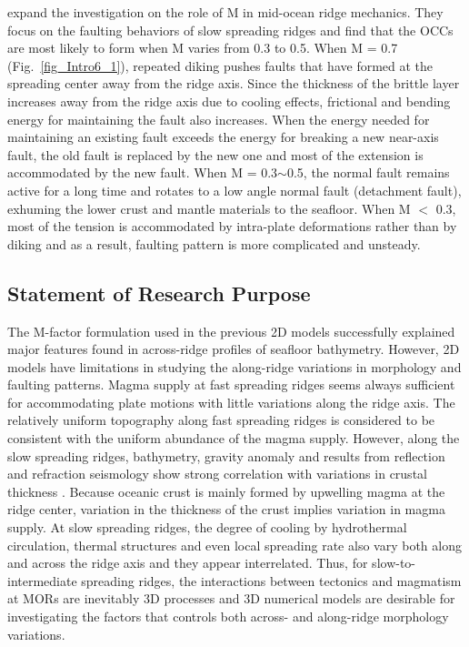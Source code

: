 \documentclass[draft,gc]{agutex}
\begin{document}
\begin{article}
\citet{Tucholke2008} expand the investigation on the role of M in mid-ocean ridge mechanics. They focus on the faulting behaviors of slow spreading ridges and find that the OCCs are most likely to form when M varies from 0.3 to 0.5. When M = 0.7 (Fig.~\ref{fig_Intro6_1}), repeated diking pushes faults that have formed at the spreading center away from the ridge axis. Since the thickness of the brittle layer increases away from the ridge axis due to cooling effects, frictional and bending energy for maintaining the fault also increases. When the energy needed for maintaining an existing fault exceeds the energy for breaking a new near-axis fault, the old fault is replaced by the new one and most of the extension is accommodated by the new fault. When M = 0.3$\sim$0.5, the normal fault remains active for a long time and rotates to a low angle normal fault (detachment fault), exhuming the lower crust and mantle materials to the seafloor. When M $<$ 0.3, most of the tension is accommodated by intra-plate deformations rather than by diking and as a result, faulting pattern is more complicated and unsteady.

\subsection{Statement of Research Purpose}
The M-factor formulation used in the previous 2D models \citep[e.g.,][]{Buck2005,Tucholke2008} successfully explained major features found in across-ridge profiles of seafloor bathymetry. However, 2D models have limitations in studying the along-ridge variations in morphology and faulting patterns. Magma supply at fast spreading ridges seems always sufficient for accommodating plate motions with little variations along the ridge axis. The relatively uniform topography along fast spreading ridges is considered to be consistent with the uniform abundance of the magma supply. However, along the slow spreading ridges, bathymetry, gravity anomaly and results from reflection and refraction seismology show strong correlation with variations in crustal thickness \citep[e.g.,][]{Lin1990, Tolstoy1993, Chen1999, Ryan2009}. Because oceanic crust is mainly formed by upwelling magma at the ridge center, variation in the thickness of the crust implies variation in magma supply. At slow spreading ridges, the degree of cooling by hydrothermal circulation, thermal structures and even local spreading rate \citep{Baines2008} also vary both along and across the ridge axis and they appear interrelated. Thus, for slow-to-intermediate spreading ridges, the interactions between tectonics and magmatism at MORs are inevitably 3D processes and 3D numerical models are desirable for investigating the factors that controls both across- and along-ridge morphology variations.


\end{article}
\end{document}
